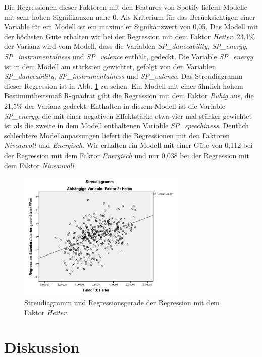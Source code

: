 Die Regressionen dieser Faktoren mit den Features von Spotify liefern Modelle mit sehr hohen Signifikanzen nahe 0.
Als Kriterium für das Berücksichtigen einer Variable für ein Modell ist ein maximaler Signikanzwert von  0,05.  
Das Modell mit der höchsten Güte erhalten wir bei der Regression mit dem Faktor \textit{Heiter}.
23,1\% der Varianz wird vom Modell, dass die Variablen \textit{SP\_danceability}, \textit{SP\_energy}, \textit{SP\_instrumentalness} und \textit{SP\_valence} enthält, gedeckt.
Die Variable \textit{SP\_energy} ist in dem Modell am stärksten gewichtet, gefolgt von den Variablen \textit{SP\_danceability},  \textit{SP\_instrumentalness} und \textit{SP\_valence}.
Das Streudiagramm dieser Regression ist in Abb. \ref{fig:Faktor3} zu sehen.    
Ein Modell mit einer ähnlich hohem Bestimmtheitsmaß R-quadrat gibt die Regression mit dem Faktor \textit{Ruhig} aus, die 21,5\% der Varianz gedeckt.
Enthalten in diesem Modell ist die Variable \textit{SP\_energy}, die mit einer negativen Effektstärke etwa vier mal stärker gewichtet ist als die zweite in dem Modell enthaltenen Variable \textit{SP\_speechiness}.
Deutlich schlechtere Modellanpassungen liefert die Regressionen mit den Faktoren \textit{Niveauvoll} und \textit{Energisch}.
Wir erhalten ein Modell mit einer Güte von 0,112 bei der Regression mit dem Faktor \textit{Energisch} und nur 0,038 bei der Regression mit dem Faktor \textit{Niveauvoll}.


\begin{figure}[hbt]
    \begin{center}
        \includegraphics[width=8cm]{images/StreudiagrammFak3.pdf}
    \end{center}
    \caption{Streudiagramm und Regressionsgerade der Regression mit dem Faktor \textit{Heiter}.}
    \label{fig:Faktor3}
\end{figure}

\section*{Diskussion}
\label{sec:Diskussion}


